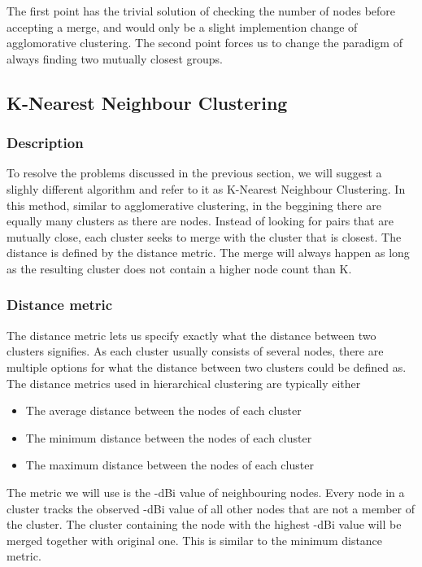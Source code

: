 The first point has the trivial solution of checking the number of nodes before accepting a merge,  and would only be a slight implemention change of agglomorative clustering. 
The second point forces us to change the paradigm of always finding two mutually closest groups. 

\subsection{K-Nearest Neighbour Clustering}
\subsubsection{Description}
To resolve the problems discussed in the previous section, we will suggest a slighly different algorithm and refer to it as K-Nearest Neighbour Clustering. 
In this method, similar to agglomerative clustering, in the beggining there are equally many clusters as there are nodes. Instead of looking for pairs that are mutually close,
each cluster seeks to merge with the cluster that is closest. The distance is defined by the distance metric. The merge will always happen as long as the resulting cluster does 
not contain a higher node count than K.

\subsubsection{Distance metric}
The distance metric lets us specify exactly what the distance between two clusters signifies. As each cluster usually consists of several nodes, there are multiple
options for what the distance between two clusters could be defined as. The distance metrics used in hierarchical clustering are typically either
\begin{itemize}
	\item The average distance between the nodes of each cluster
	\item The minimum distance between the nodes of each cluster
	\item The maximum distance between the nodes of each cluster
\end{itemize}

The metric we will use is the -dBi value of neighbouring nodes. Every node in a cluster tracks the observed -dBi value of all other nodes that are not a member of the cluster.
The cluster containing the node with the highest -dBi value will be merged together with original one. This is similar to the minimum distance metric. 

